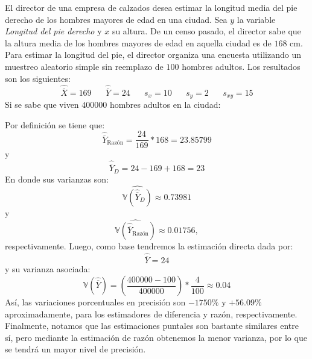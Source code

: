 \addpoints
\question[20] El director de una empresa de calzados desea estimar la longitud media del pie derecho de los hombres mayores de edad en una ciudad. Sea $y$ la variable \textit{Longitud del pie derecho} y $x$ su altura. De un censo pasado, el director sabe que la altura media de los hombres mayores de edad en aquella ciudad es de $168$ cm. Para estimar la longitud del pie, el director organiza una encuesta utilizando un muestreo aleatorio simple sin reemplazo de $100$ hombres adultos. Los resultados son los siguientes:
$$\hat{\overline{X}}=169 \hspace{20pt} \hat{\overline{Y}}=24 \hspace{20pt} s_{x}=10  \hspace{20pt} s_{y}=2  \hspace{20pt} s_{xy}=15$$
Si se sabe que viven $400000$ hombres adultos en la ciudad:
\noaddpoints
{}
\begin{solution}
Por definición se tiene que:
$$\hat{\overline{Y}}_{\text{Razón}}=\dfrac{24}{169}*168=23.85799$$
y
$$\hat{\overline{Y}}_{D}=24-169+168=23$$
En donde sus varianzas son:
$$\widehat{\mathbb{V}(\hat{\overline{Y}}_{D})}\approx 0.73981$$
y
$$\widehat{\mathbb{V}(\hat{\overline{Y}}_{\text{Razón}})}\approx 0.01756,$$
respectivamente. Luego, como base tendremos la estimación directa dada por:
$$\hat{\overline{Y}}=24$$
y su varianza asociada:
$$\mathbb{V}(\hat{\overline{Y}})=\left(\dfrac{400000-100}{400000}\right)*\dfrac{4}{100} \approx 0.04$$
Así, las variaciones porcentuales en precisión son $-1750\%$ y $+56.09\%$ aproximadamente, para los estimadores de diferencia y razón, respectivamente. Finalmente, notamos que las estimaciones puntales son bastante similares entre sí, pero mediante la estimación de razón obtenemos la menor varianza, por lo que se tendrá un mayor nivel de precisión.
\end{solution}